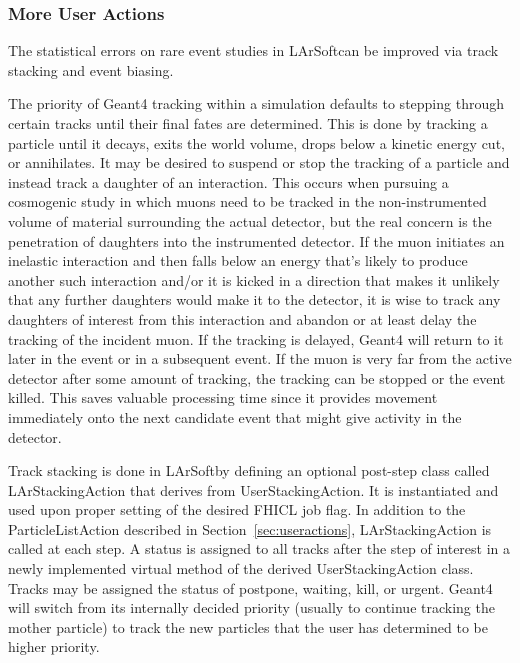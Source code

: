\documentclass[12pt]{elsarticle}
\newcommand{\larsoft}{LArSoft}
\begin{document}
\subsubsection{More User Actions}
\label{susubsec:trackstackingandeventbiasing}

The statistical errors on rare event studies in \larsoft can be improved via track stacking and event biasing.

The priority of Geant4 tracking within a simulation defaults to stepping through certain tracks
until their final fates are determined. This is done 
by tracking a particle until it decays, exits the world volume, drops below a kinetic
energy cut, or annihilates. It may be desired to suspend or stop 
the tracking of a particle and instead track a daughter of an interaction. 
This occurs when pursuing a cosmogenic study in which muons need to be tracked in 
the non-instrumented volume of material surrounding the actual detector, but the real concern is the penetration of daughters into the instrumented detector. If the muon initiates an inelastic interaction and then falls below 
an energy that's likely to produce another such interaction and/or it is kicked in a direction that makes
it unlikely that any further daughters would make it to the detector, it is wise to
track any daughters of interest from this interaction and abandon or at least delay the tracking of the incident muon.
If the tracking is delayed, Geant4 will return to it later in the event or in a subsequent event. If the muon is very far from the active detector after some amount of tracking, the tracking can be stopped or the event killed. This saves valuable processing time since it provides movement
immediately onto the next candidate event that might give activity in the detector.

Track stacking is done in \larsoft by defining an optional post-step class 
called LArStackingAction that derives from UserStackingAction. It is instantiated and used upon proper setting of the desired 
FHICL job flag. In addition to the ParticleListAction 
described in Section~\ref{sec:useractions}, LArStackingAction is called at each step.
A status is assigned to all 
tracks after the step of interest in a 
newly implemented virtual method of the derived UserStackingAction class. 
Tracks may be assigned the status of
postpone, waiting, kill, or urgent. Geant4 will switch from its internally decided priority (usually to continue tracking the mother particle) to track the new particles that
the user has determined to be higher priority. 
\end{document}
